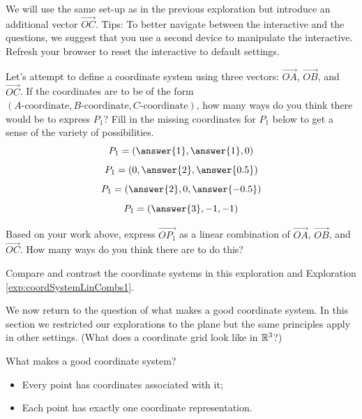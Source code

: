 \documentclass{ximera}
\begin{document}
\begin{exploration}\label{exp:coordSystemLinCombs2}
We will use the same set-up as in the previous exploration but introduce an additional vector $\overrightarrow{OC}$.  Tips: To better navigate between the interactive and the questions, we suggest that you use a second device to manipulate the interactive.  Refresh your browser to reset the interactive to default settings.


 \begin{center}
 \end{center}

 \begin{question}
     Let's attempt to define a coordinate system using three vectors: $\overrightarrow{OA}$, $\overrightarrow{OB}$, and $\overrightarrow{OC}$.  If the coordinates are to be of the form $(A\text{-coordinate}, B\text{-coordinate}, C\text{-coordinate})$, how many ways do you think there would be to express $P_1$? Fill in the missing coordinates for $P_1$ below to get a sense of the variety of possibilities.
     $$P_1=\left(\answer{1},\answer{1},0\right)$$
     $$P_1=\left(0,\answer{2},\answer{0.5}\right)$$
     $$P_1=\left(\answer{2}, 0, \answer{-0.5}\right)$$
     $$P_1=\left(\answer{3},-1,-1\right)$$
 \end{question}

 \begin{question}
     Based on your work above, express $\overrightarrow{OP_1}$ as a linear combination of $\overrightarrow{OA}$, $\overrightarrow{OB}$, and $\overrightarrow{OC}$.  How many ways do you think there are to do this?
 \end{question}

 \begin{question}
     Compare and contrast the coordinate systems in this exploration and Exploration \ref{exp:coordSystemLinCombs1}.  
 \end{question}
    
\end{exploration}

We now return to the question of what makes a good coordinate system.  In this section we restricted our explorations to the plane but the same principles apply in other settings.  (What does a coordinate grid look like in $\mathbb{R}^3$?)

\begin{idea}
    What makes a good coordinate system?
    \begin{itemize}
        \item Every point has coordinates associated with it;
        \item Each point has exactly one coordinate representation.
    \end{itemize}
\end{idea}
\end{document}
